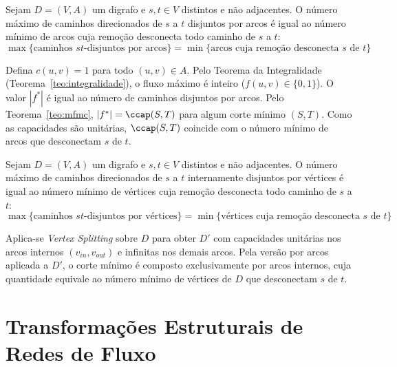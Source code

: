\begin{teorema}
Sejam $D = (V, A)$ um digrafo e $s, t \in V$ distintos e não adjacentes. O número máximo de caminhos direcionados de $s$ a $t$ disjuntos por arcos é igual ao número mínimo de arcos cuja remoção desconecta todo caminho de $s$ a $t$:
\begin{equation}
    \max\{\text{caminhos $st$-disjuntos por arcos}\} = \min\{\text{arcos cuja remoção desconecta $s$ de $t$}\}
\end{equation}
\end{teorema}

\begin{demonstracao}
Defina $c(u,v) = 1$ para todo $(u,v) \in A$. Pelo Teorema da Integralidade (Teorema~\ref{teo:integralidade}), o fluxo máximo é inteiro ($f(u,v) \in \{0, 1\}$). O valor $|f^*|$ é igual ao número de caminhos disjuntos por arcos. Pelo Teorema~\ref{teo:mfmc}, $|f^*| = \ccap(S,T)$ para algum corte mínimo $(S,T)$. Como as capacidades são unitárias, $\ccap(S,T)$ coincide com o número mínimo de arcos que desconectam $s$ de $t$.
\end{demonstracao}

\begin{teorema}
Sejam $D = (V, A)$ um digrafo e $s, t \in V$ distintos e não adjacentes. O número máximo de caminhos direcionados de $s$ a $t$ internamente disjuntos por vértices é igual ao número mínimo de vértices cuja remoção desconecta todo caminho de $s$ a $t$:
\begin{equation}
    \max\{\text{caminhos $st$-disjuntos por vértices}\} = \min\{\text{vértices cuja remoção desconecta $s$ de $t$}\}
\end{equation}
\end{teorema}

\begin{demonstracao}
Aplica-se \textit{Vertex Splitting} sobre $D$ para obter $D'$ com capacidades unitárias nos arcos internos $(v_{in}, v_{out})$ e infinitas nos demais arcos. Pela versão por arcos aplicada a $D'$, o corte mínimo é composto exclusivamente por arcos internos, cuja quantidade equivale ao número mínimo de vértices de $D$ que desconectam $s$ de $t$.
\end{demonstracao}


\section{Transformações Estruturais de Redes de Fluxo}


